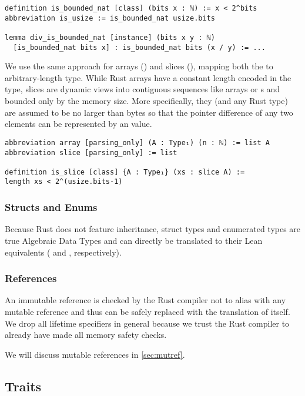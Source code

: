 \begin{verbatim}
definition is_bounded_nat [class] (bits x : ℕ) := x < 2^bits
abbreviation is_usize := is_bounded_nat usize.bits

lemma div_is_bounded_nat [instance] (bits x y : ℕ)
  [is_bounded_nat bits x] : is_bounded_nat bits (x / y) := ...
\end{verbatim}

We use the same approach for arrays (\rust{[T; N]}) and slices (\rust{&[T]}),
mapping both the to arbitrary-length  type. While Rust arrays have a
constant length encoded in the type, slices are dynamic views into contiguous sequences
like arrays or s and bounded only by the memory size. More
specifically, they (and any Rust type) are assumed to be no larger than
 bytes so that the pointer difference of any two elements can
be represented by an  value.

\begin{verbatim}
abbreviation array [parsing_only] (A : Type₁) (n : ℕ) := list A
abbreviation slice [parsing_only] := list

definition is_slice [class] {A : Type₁} (xs : slice A) :=
length xs < 2^(usize.bits-1)
\end{verbatim}

\subsubsection{Structs and Enums}

Because Rust does not feature inheritance, struct types and enumerated types are
true Algebraic Data Types and can directly be translated to their Lean
equivalents ( and , respectively).

\subsubsection{References}
\label{sec:refs}

An immutable reference  is checked by the Rust compiler not to alias
with any mutable reference and thus can be safely replaced with the translation
of  itself. We drop all lifetime specifiers in general because we trust
the Rust compiler to already have made all memory safety checks.

We will discuss mutable references in \autoref{sec:mutref}.

\subsection{Traits}

